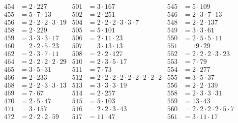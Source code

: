 \begin{align*}
  454&=2\cdot227                             & 501&=3\cdot167                                         & 545&=5\cdot109                        \\
  455&=5\cdot7\cdot13                        & 502&=2\cdot251                                         & 546&=2\cdot3\cdot7\cdot13             \\
  456&=2\cdot2\cdot2\cdot3\cdot19            & 504&=2\cdot2\cdot2\cdot3\cdot3\cdot7                   & 548&=2\cdot2\cdot137                  \\
  458&=2\cdot229                             & 505&=5\cdot101                                         & 549&=3\cdot3\cdot61                   \\
  459&=3\cdot3\cdot3\cdot17                  & 506&=2\cdot11\cdot23                                   & 550&=2\cdot5\cdot5\cdot11             \\
  460&=2\cdot2\cdot5\cdot23                  & 507&=3\cdot13\cdot13                                   & 551&=19\cdot29                        \\
  462&=2\cdot3\cdot7\cdot11                  & 508&=2\cdot2\cdot127                                   & 552&=2\cdot2\cdot2\cdot3\cdot23       \\
  464&=2\cdot2\cdot2\cdot2\cdot29            & 510&=2\cdot3\cdot5\cdot17                              & 553&=7\cdot79                         \\
  465&=3\cdot5\cdot31                        & 511&=7\cdot73                                          & 554&=2\cdot277                        \\
  466&=2\cdot233                             & 512&=2\cdot2\cdot2\cdot2\cdot2\cdot2\cdot2\cdot2\cdot2 & 555&=3\cdot5\cdot37                   \\
  468&=2\cdot2\cdot3\cdot3\cdot13            & 513&=3\cdot3\cdot3\cdot19                              & 556&=2\cdot2\cdot139                  \\
  469&=7\cdot67                              & 514&=2\cdot257                                         & 558&=2\cdot3\cdot3\cdot31             \\
  470&=2\cdot5\cdot47                        & 515&=5\cdot103                                         & 559&=13\cdot43                        \\
  471&=3\cdot157                             & 516&=2\cdot2\cdot3\cdot43                              & 560&=2\cdot2\cdot2\cdot2\cdot5\cdot7  \\
  472&=2\cdot2\cdot2\cdot59                  & 517&=11\cdot47                                         & 561&=3\cdot11\cdot17                  \\

\end{align*}
